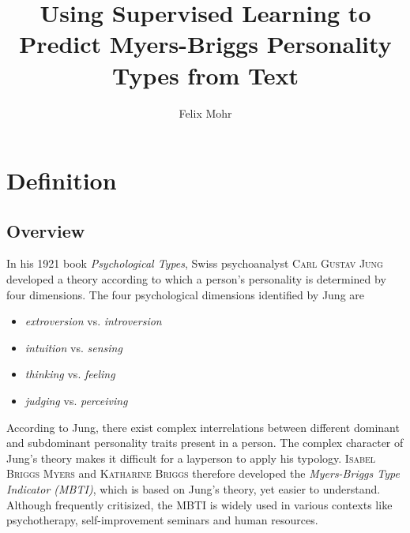 \documentclass[12pt]{elsarticle}
\begin{document}
\begin{frontmatter}
\title{Using Supervised Learning to Predict Myers-Briggs Personality Types from Text}
\author{Felix Mohr}
\address{Karlsruhe, Germany}

\end{frontmatter}


\section{Definition}

\subsection{Overview}
\label{subsec:overview}
In his 1921 book \textit{Psychological Types}, Swiss psychoanalyst \textsc{Carl Gustav Jung} developed a theory according to which a person's personality is determined by four dimensions. The four psychological dimensions identified by Jung are
\begin{itemize}
\item \textit{extroversion} vs. \textit{introversion}
\item \textit{intuition} vs. \textit{sensing}
\item \textit{thinking} vs. \textit{feeling}
\item \textit{judging} vs. \textit{perceiving}
\end{itemize}
According to Jung, there exist complex interrelations between different dominant and subdominant personality traits present in a person. The complex character of Jung's theory makes it difficult for a layperson to apply his typology. \textsc{Isabel Briggs Myers} and \textsc{Katharine Briggs}  therefore developed the \textit{Myers-Briggs Type Indicator (MBTI)}, which is based on Jung's theory, yet easier to understand. Although frequently critisized, the MBTI is widely used in various contexts like psychotherapy, self-improvement seminars and human resources.
\end{document}
